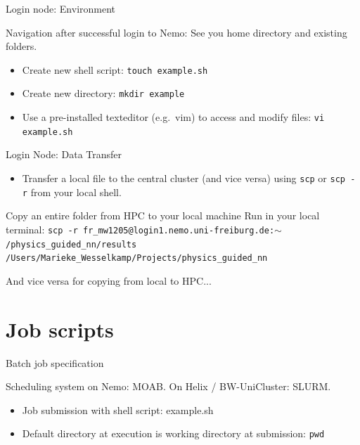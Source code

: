 \documentclass{beamer}
\begin{document}
\begin{frame}{Login node: Environment}

Navigation after successful login to Nemo: See you home directory and existing folders.

\scalebox{0.7}{

}
\vspace{0.6cm}

\begin{itemize}
    \item Create new shell script: \texttt{touch example.sh}
    \item Create new directory: \texttt{mkdir example}
    \item Use a pre-installed texteditor (e.g.~vim) to access and modify files: \texttt{vi example.sh}
\end{itemize}


\end{frame}

\begin{frame}{Login Node: Data Transfer}

\begin{itemize}
    \item Transfer a local file to the central cluster (and vice versa) using \texttt{scp} or \texttt{scp -r} from your local shell.
\end{itemize}

\vspace{0.5cm}

\begin{block}{Copy an entire folder from HPC to your local machine}
Run in your local terminal:
\vspace{0.1cm}
\footnotesize
\texttt{scp -r fr\_mw1205@login1.nemo.uni-freiburg.de:$\sim$/physics\_guided\_nn/results /Users/Marieke\_Wesselkamp/Projects/physics\_guided\_nn}
\end{block}
\vspace{0.1cm}

And vice versa for copying from local to HPC...

\end{frame}

\section{Job scripts}


\begin{frame}{Batch job specification}

Scheduling system on Nemo: MOAB. On Helix / BW-UniCluster: SLURM.

\begin{itemize}
    \item Job submission with shell script: example.sh
    \item Default directory at execution is working directory at submission: \texttt{pwd}
\end{itemize}

\end{frame}
\end{document}
